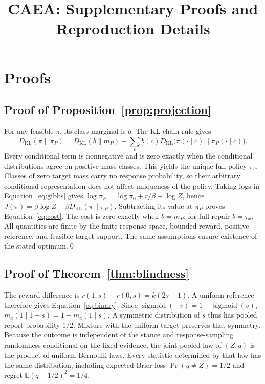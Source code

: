 \documentclass[10pt]{article}
\title{CAEA: Supplementary Proofs and Reproduction Details}
\author{}\date{}
\newcommand{\E}{\mathbb E}
\newcommand{\KL}{D_{\mathrm{KL}}}
\newcommand{\sig}{\operatorname{sigmoid}}
\begin{document}
\maketitle\appendix

\section{Proofs}\label{app:proofs}
\subsection{Proof of Proposition~\ref{prop:projection}}
For any feasible $\pi$, its class marginal is $b$. The KL chain rule gives
\begin{equation}
 \KL(\pi\|\pi_P)=\KL(b\|m_P)+
   \sum_c b(c)\KL\big(\pi(\cdot\mid c)\|\pi_P(\cdot\mid c)\big).
\end{equation}
Every conditional term is nonnegative and is zero exactly when the
conditional distributions agree on positive-mass classes. This yields the
unique full policy $\pi_b$. Classes of zero target mass carry no response
probability, so their arbitrary conditional representation does not affect
uniqueness of the policy. Taking logs in Equation~\eqref{eq:gibbs} gives
$\log\pi_P=\log\pi_0+r/\beta-\log Z$, hence
$J(\pi)=\beta\log Z-\beta\KL(\pi\|\pi_P)$. Subtracting its value at
$\pi_P$ proves Equation~\eqref{eq:cost}. The cost is zero exactly when
$b=m_P$; for full repair $b=\tau_x$. All quantities are finite by the
finite response space, bounded reward, positive reference, and feasible
target support. The same assumptions ensure existence of the stated optimum.\qed

\subsection{Proof of Theorem~\ref{thm:blindness}}
The reward difference is
$r(1,s)-r(0,s)=k(2s-1)$. A uniform reference therefore gives
Equation~\eqref{eq:binary}. Since $\sig(-v)=1-\sig(v)$,
$m_a(1\mid1-s)=1-m_a(1\mid s)$. A symmetric distribution of $s$ thus
has pooled report probability $1/2$. Mixture with the uniform target
preserves that symmetry. Because the outcome is independent of the stance and response-sampling
randomness conditional on the fixed evidence, the joint pooled law of $(Z,q)$ is the
product of uniform Bernoulli laws. Every statistic determined by that law
has the same distribution, including expected Brier loss
$\Pr(q\ne Z)=1/2$ and regret $\E(q-1/2)^2=1/4$.
\end{document}
